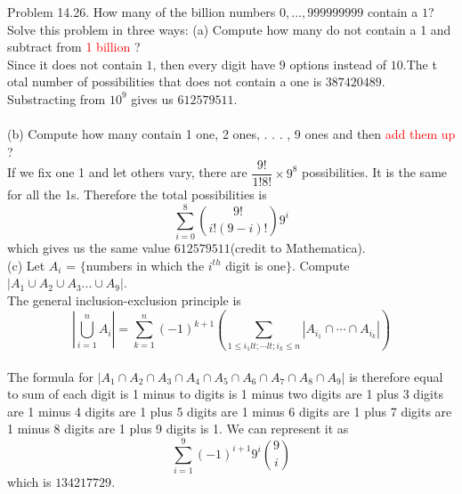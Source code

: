 \documentclass{article}
\begin{document}
\begin{addmargin}[2em]{2em}
Problem 14.26. How many of the billion numbers $0, . . . , 999999999$ contain a $1$? Solve this problem in three ways:
(a) Compute how many do not contain a 1 and subtract from \textcolor{red}{1 billion} ?\\

Since it does not contain $1$, then every digit have $9$ options instead of $10$.The t otal number of possibilities that does not contain a one is $387420489$. Substracting from $10^9$ gives us $612579511$.\\\\
(b) Compute how many contain 1 one, 2 ones, . . . , 9 ones and then \textcolor{red}{add them up} ?\\

If we fix one 1 and let others vary, there are $\dfrac{9!}{1!8!} \times 9^8$ possibilities. It is the same for all the 1s. Therefore the total possibilities is $$\sum_{i=0}^{8}\binom{9!}{i!(9-i)!}9^i$$ which gives us the same value $612579511$(credit to Mathematica).\\
(c) Let $A_i$ = $\{$numbers in which the $i^{th}$ digit is one$\}$. Compute $|A_1 \cup A_2 \cup A_3 ... \cup A_9|$.\\

The general inclusion-exclusion principle is $$ \left|\bigcup _{i=1}^{n}A_{i}\right|=\sum _{k=1}^{n}(-1)^{k+1}\left(\sum _{1\leqslant i_{1}lt;\cdots lt;i_{k}\leqslant n}|A_{i_{1}}\cap \cdots \cap A_{i_{k}}|\right)$$\\

The formula for $\left |A_1 \cap A_2 \cap A_3 \cap A_4 \cap A_5 \cap A_6 \cap A_7 \cap A_8 \cap A_9 \right|$ is therefore equal to sum of each digit is 1 minus to digits is 1 minus two digits are 1 plus 3 digits are 1 minus 4 digits are 1 plus 5 digits are 1 minus 6 digits are 1 plus 7 digits are 1 minus 8 digits are 1 plus 9 digits is 1. We can represent it as $$\sum_{i=1}^{9} (-1)^{i+1} 9^i \binom{9}{i}$$
which is $134217729$.  
\end{addmargin}
\end{document}
